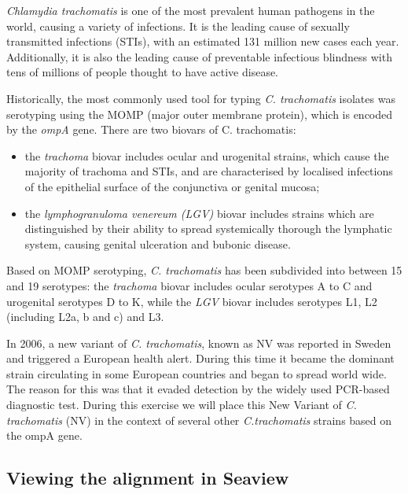 \documentclass[11pt]{article}
\providecommand{\tightlist}{%
      \setlength{\itemsep}{0pt}\setlength{\parskip}{0pt}}
\begin{document}
\textit{Chlamydia trachomatis} is one of the most prevalent human
pathogens in the world, causing a variety of infections. It is the
leading cause of sexually transmitted infections (STIs), with an
estimated 131 million new cases each year. Additionally, it is also the
leading cause of preventable infectious blindness with tens of millions
of people thought to have active disease.

Historically, the most commonly used tool for typing \textit{C.
trachomatis} isolates was serotyping using the MOMP (major outer
membrane protein), which is encoded by the \textit{ompA} gene. There are
two biovars of C. trachomatis:

\begin{itemize}
\tightlist
\item
  the \textit{trachoma} biovar includes ocular and urogenital strains,
  which cause the majority of trachoma and STIs, and are characterised
  by localised infections of the epithelial surface of the conjunctiva
  or genital mucosa;
\item
  the \textit{lymphogranuloma venereum (LGV)} biovar includes strains
  which are distinguished by their ability to spread systemically
  thorough the lymphatic system, causing genital ulceration and bubonic
  disease.
\end{itemize}

Based on MOMP serotyping, \textit{C. trachomatis} has been subdivided into
between 15 and 19 serotypes: the \textit{trachoma} biovar includes ocular
serotypes A to C and urogenital serotypes D to K, while the \textit{LGV}
biovar includes serotypes L1, L2 (including L2a, b and c) and L3.

In 2006, a new variant of \textit{C. trachomatis}, known as NV was
reported in Sweden and triggered a European health alert. During this
time it became the dominant strain circulating in some European
countries and began to spread world wide. The reason for this was that
it evaded detection by the widely used PCR-based diagnostic test. During
this exercise we will place this New Variant of \textit{C. trachomatis}
(NV) in the context of several other \textit{C.trachomatis} strains based
on the ompA gene.

    \hypertarget{viewing-the-alignment-in-seaview}{%
\subsection{Viewing the alignment in
Seaview}\label{viewing-the-alignment-in-seaview}}
\end{document}
